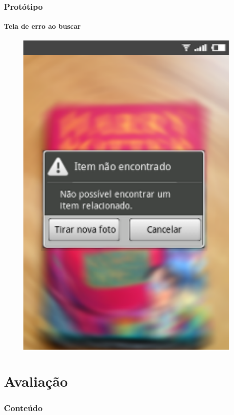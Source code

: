 \documentclass[14pt,beamer]{beamer}
\begin{document}
\begin{frame}
	\frametitle{Protótipo}
	\framesubtitle{Tela de erro ao buscar}

    \vspace{-5px}
    \begin{figure}
        \centering
        \includegraphics[scale=.71]{tela/TelaErro}
    \end{figure}
\end{frame}

\section{Avaliação}

\begin{frame}
	\frametitle{Conteúdo}
    \begin{multicols}{2}
        \footnotesize
    \end{multicols}
\end{frame}
\end{document}
